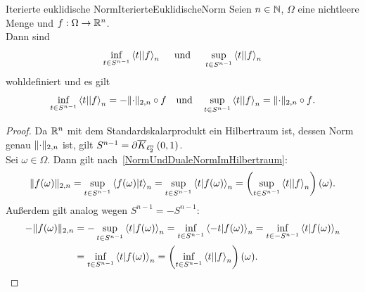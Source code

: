 \begin{korollar}{Iterierte euklidische Norm}{IterierteEuklidischeNorm}
Seien $n \in \mathbb{N}$, $\Omega$ eine nichtleere Menge und
$f: \Omega \rightarrow \mathbb{R}^n$.\\
Dann sind
\[\inf_{t \in S^{n-1}}\left\langle t ||f\right\rangle_n
\quad \text{ und }\quad \sup_{t \in S^{n-1}}\left\langle t ||f\right\rangle_n\]
wohldefiniert und es gilt
\[\inf_{t \in S^{n-1}}\left\langle t ||f\right\rangle_n = - \lVert\cdot\rVert_{2, n} \circ f \quad
\text{und}\quad
\sup_{t \in S^{n-1}}\left\langle t ||f\right\rangle_n = \lVert\cdot\rVert_{2, n} \circ f\text.\]
\end{korollar}
\begin{proof}
Da $\mathbb{R}^n$ mit dem Standardskalarprodukt ein Hilbertraum ist, dessen
Norm genau $\lVert\cdot\rVert_{2, n}$ ist, gilt $S^{n-1} = \partial \overline K_{\ell_2^n}\left(0, 1\right)$.\\
Sei $\omega \in \Omega$.
Dann gilt nach~\ref{NormUndDualeNormImHilbertraum}:
\[\lVert f(\omega)\rVert_{2, n} = \sup_{t \in S^{n-1}} \left\langle f(\omega) |t\right\rangle_n
= \sup_{t \in S^{n-1}} \left\langle t |f(\omega)\right\rangle_n =
\left(\sup_{t \in S^{n-1}} \left\langle t ||f\right\rangle _n\right)(\omega)\text.\]
Außerdem gilt analog wegen $S^{n-1}=-S^{n-1}$:
\begin{align*}
-\lVert f(\omega)\rVert_{2, n}& = -\sup_{t \in S^{n-1}} \left\langle t |f(\omega)\right\rangle_n
= \inf_{t \in S^{n-1}} \left\langle -t |f(\omega)\right\rangle_n
= \inf_{t \in - S^{n-1}}\left\langle t |f(\omega)\right\rangle_n\\
&= \inf_{t \in S^{n-1}}\left\langle t |f(\omega)\right\rangle_n
= \left(\inf_{t \in S^{n-1}} \left\langle t ||f\right\rangle _n\right)(\omega)\text.
\end{align*}
\end{proof}
